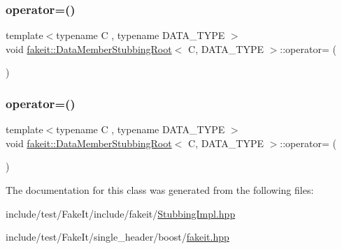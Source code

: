 \mbox{\label{classfakeit_1_1DataMemberStubbingRoot_a9658c86eff24d9703cda9318c0c59001}} 
\subsubsection{\texorpdfstring{operator=()}{operator=()}\hspace{0.1cm}{\footnotesize\ttfamily [8/9]}}
{\footnotesize\ttfamily template$<$typename C , typename D\+A\+T\+A\+\_\+\+T\+Y\+PE $>$ \\
void \mbox{\hyperlink{classfakeit_1_1DataMemberStubbingRoot}{fakeit\+::\+Data\+Member\+Stubbing\+Root}}$<$ C, D\+A\+T\+A\+\_\+\+T\+Y\+PE $>$\+::operator= (\begin{DoxyParamCaption}\item[{const D\+A\+T\+A\+\_\+\+T\+Y\+PE \&}]{ }\end{DoxyParamCaption})\hspace{0.3cm}{\ttfamily [inline]}}

\mbox{\label{classfakeit_1_1DataMemberStubbingRoot_a9658c86eff24d9703cda9318c0c59001}} 
\subsubsection{\texorpdfstring{operator=()}{operator=()}\hspace{0.1cm}{\footnotesize\ttfamily [9/9]}}
{\footnotesize\ttfamily template$<$typename C , typename D\+A\+T\+A\+\_\+\+T\+Y\+PE $>$ \\
void \mbox{\hyperlink{classfakeit_1_1DataMemberStubbingRoot}{fakeit\+::\+Data\+Member\+Stubbing\+Root}}$<$ C, D\+A\+T\+A\+\_\+\+T\+Y\+PE $>$\+::operator= (\begin{DoxyParamCaption}\item[{const D\+A\+T\+A\+\_\+\+T\+Y\+PE \&}]{ }\end{DoxyParamCaption})\hspace{0.3cm}{\ttfamily [inline]}}



The documentation for this class was generated from the following files\+:\begin{DoxyCompactItemize}
\item 
include/test/\+Fake\+It/include/fakeit/\mbox{\hyperlink{StubbingImpl_8hpp}{Stubbing\+Impl.\+hpp}}\item 
include/test/\+Fake\+It/single\+\_\+header/boost/\mbox{\hyperlink{single__header_2boost_2fakeit_8hpp}{fakeit.\+hpp}}\end{DoxyCompactItemize}
